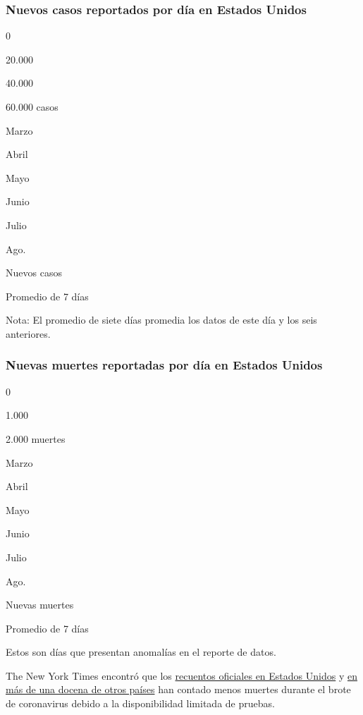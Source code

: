 \hypertarget{nuevos-casos-reportados-por-duxeda-en-estados-unidos}{%
\subsubsection{Nuevos casos reportados por día en Estados
Unidos}\label{nuevos-casos-reportados-por-duxeda-en-estados-unidos}}

0

20.000

40.000

60.000 casos

Marzo

Abril

Mayo

Junio

Julio

Ago.

Nuevos casos

Promedio de 7 días

Nota: El promedio de siete días promedia los datos de este día y los
seis anteriores.

\hypertarget{nuevas-muertes-reportadas-por-duxeda-en-estados-unidos}{%
\subsubsection{Nuevas muertes reportadas por día en Estados
Unidos}\label{nuevas-muertes-reportadas-por-duxeda-en-estados-unidos}}

0

1.000

2.000 muertes

Marzo

Abril

Mayo

Junio

Julio

Ago.

Nuevas muertes

Promedio de 7 días

Estos son días que presentan anomalías en el reporte de datos.

The New York Times encontró que los
\href{https://www.nytimes3xbfgragh.onion/interactive/2020/04/28/us/coronavirus-death-toll-total.html}{recuentos
oficiales en Estados Unidos} y
\href{https://www.nytimes3xbfgragh.onion/interactive/2020/04/21/world/coronavirus-missing-deaths.html}{en
más de una docena de otros países} han contado menos muertes durante el
brote de coronavirus debido a la disponibilidad limitada de pruebas.

